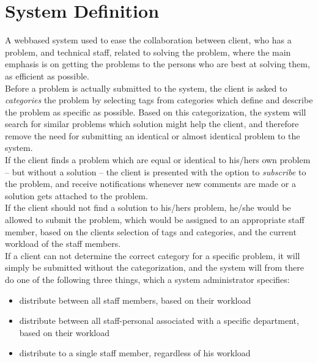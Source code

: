 \section{System Definition}
\label{sec:systemdefinition}

A webbased system used to ease the collaboration between client, who has a problem, and technical staff, related to solving the problem, where the main emphasis is on getting the problems to the persons who are best at solving them, as efficient as possible. \\


Before a problem is actually submitted to the system, the client is asked to \textit{categories} the problem by selecting tags from categories which define and describe the problem as specific as possible. Based on this categorization, the system will search for similar problems which solution might help the client, and therefore remove the need for submitting an identical or almost identical problem to the system.\\

If the client finds a problem which are equal or identical to his/hers own problem -- but without a solution -- the client is presented with the option to \textit{subscribe} to the problem, and receive notifications whenever new comments are made or a solution gets attached to the problem. \\

If the client should not find a solution to his/hers problem, he/she would be allowed to submit the problem, which would be assigned to an appropriate staff member, based on the clients selection of tags and categories, and the current workload of the staff members. \\

If a client can not determine the correct category for a specific problem, it will simply be submitted without the categorization, and the system will from there do one of the following three things, which a system administrator specifies:

\begin{itemize}
	\item distribute between all staff members, based on their workload
	\item distribute between all staff-personal associated with a specific department, based on their workload
	\item distribute to a single staff member, regardless of his workload
\end{itemize}

